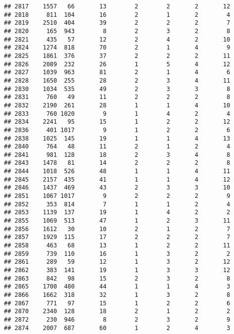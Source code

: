 \documentclass[]{article}
\begin{document}
\begin{verbatim}
## 2817    1557   66       13        2        2       2       12
## 2818     811  104       16        2        1       2        4
## 2819    2510  404       39        2        2       2        7
## 2820     165  943        8        2        3       2        8
## 2821     435   57       12        2        4       2       10
## 2824    1274  818       70        2        1       4        9
## 2825    1861  376       37        2        2       2       11
## 2826    2089  232       26        1        5       4       12
## 2827    1039  963       81        2        1       4        6
## 2828    1650  255       28        2        3       4       11
## 2830    1034  535       49        2        3       3        8
## 2831     760   49       11        2        2       2        8
## 2832    2190  261       28        1        1       4       10
## 2833     760 1020        9        1        4       2        4
## 2834    2241   95       15        1        2       2       12
## 2836     401 1017        9        1        2       2        6
## 2838    1025  145       19        1        1       4       13
## 2840     764   48       11        2        1       2        4
## 2841     981  128       18        2        3       4        8
## 2843    1478   81       14        2        2       2        8
## 2844    1018  526       48        1        1       4       11
## 2845    2157  435       41        1        1       4       12
## 2846    1437  469       43        2        3       3       10
## 2851    1067 1017        9        2        2       2        9
## 2852     353  814        7        1        1       2        4
## 2853    1139  137       19        1        4       2        2
## 2855    1069  513       47        1        2       3       11
## 2856    1612   30       10        2        1       2        7
## 2857    1929  115       17        2        2       2        7
## 2858     463   68       13        1        2       2       11
## 2859     739  110       16        1        3       2        2
## 2861     289   59       12        1        3       2       12
## 2862     383  141       19        1        3       3       12
## 2863     842   98       15        2        3       2        8
## 2865    1700  480       44        1        1       4        3
## 2866    1662  318       32        1        3       2        8
## 2867     771   97       15        1        2       2        6
## 2870    2340  128       18        2        1       2        2
## 2872     230  946        8        2        3       2        9
## 2874    2007  687       60        1        2       4        3

\end{verbatim}
\end{document}
